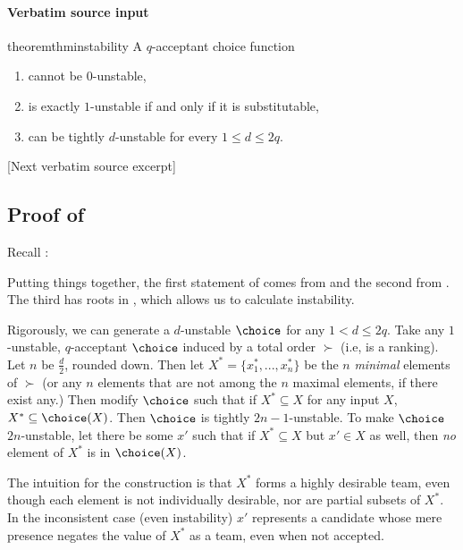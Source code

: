 \documentclass[10pt]{article}
\begin{document}
\paragraph{Verbatim source input}
\begin{ReviewVerbatim}
\begin{restatable}{theorem}{thminstability}
\label{thm:instability}
A $q$-acceptant choice function
\begin{enumerate}
    \item cannot be $0$-unstable,
    \item  is exactly $1$-unstable if and only if it is substitutable,
    \item can be tightly $d$-unstable for every $1\leq d \leq 2q$.
\end{enumerate}

\end{restatable}%

[Next verbatim source excerpt]

\subsection{Proof of } \label{sec:instability-proof}

Recall :
\thminstability*

Putting things together, the first statement of  comes from  and the second from . The third
has roots in , which allows us to calculate instability.

Rigorously, we can generate a $d$-unstable $\choice$ for any $1 < d \leq 2q$. Take any $1$-unstable, $q$-acceptant $\choice$ induced by a total order $\succ$ (i.e, is a ranking). Let $n$ be $\frac{d}{2}$, rounded down. Then let $X^* = \{x^*_1, ..., x^*_n\}$ be the $n$ \textit{minimal} elements of $\succ$ (or any $n$ elements that are not among the $n$ maximal elements, if there exist any.) Then modify $\choice$ such that if $X^* \subseteq X$ for any input $X$, $X^* \subseteq \choice(X)$. Then $\choice$ is tightly $2n-1$-unstable. To make $\choice$ $2n$-unstable, let there be some $x'$ such that if $X^* \subseteq X$ but $x' \in X$ as well, then \textit{no} element of $X^*$ is in $\choice(X)$. %

The intuition for the construction is that $X^*$ forms a highly desirable team, even though each element is not individually desirable, nor are partial subsets of $X^*$.
In the inconsistent case (even instability) $x'$ represents a candidate whose mere presence negates the value of $X^*$ as a team, even when not accepted.
\end{ReviewVerbatim}
\end{document}
